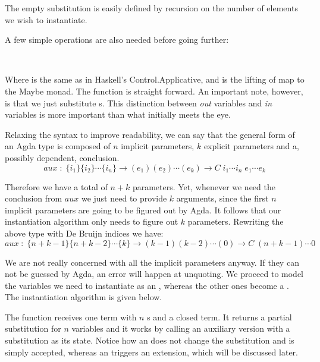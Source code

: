 
The empty substitution is easily defined by recursion on the number of elements we wish to instantiate.


A few simple operations are also needed before going further:

\\

Where \F{$\_<\$>\_$} is the same as in Haskell's Control.Applicative, and  is the lifting of map to the Maybe monad. The  function is straight forward. An important note, however, is that we just substitute s. This distinction between \emph{out} variables and \emph{in} variables is more important than what initially meets the eye. 

Relaxing the syntax to improve readability, we can say that the general form of an Agda type is composed of $n$ implicit parameters, $k$ explicit parameters and a, possibly dependent, conclusion.
\[
aux\;:\;\{ i_1 \}\{ i_2 \} \cdots \{ i_n \} \rightarrow ( e_1 )( e_2) \cdots (e_k) \rightarrow C\;i_1\cdots i_n\;e_1\cdots e_k
\]

Therefore we have a total of $n+k$ parameters. Yet, whenever we need the conclusion from $aux$ we just need to provide $k$ arguments, since the first
$n$ implicit parameters are going to be figured out by Agda. It follows that our instantiation algorithm only needs to figure out $k$ parameters. Rewriting the above type with De Bruijn indices we have:
\[
aux\;:\;\{ n+k - 1 \}\{ n+k - 2\} \cdots \{ k \} \rightarrow (k-1)(k-2) \cdots (0) \rightarrow C\;(n+k - 1) \cdots 0
\]

We are not really concerned with all the implicit parameters anyway. If they can not be guessed by Agda, an error will happen at unquoting. We proceed to
model the variables we need to instantiate as an , whereas the other ones become a . The instantiation algorithm is given below. 


The  function receives one term with $n$ s and a closed term. It returns a partial substitution for $n$ variables and it works by calling an auxiliary version with a substitution as its state. Notice how an  does not change the substitution and is simply accepted, whereas an  triggers an extension, which will be discussed later.

